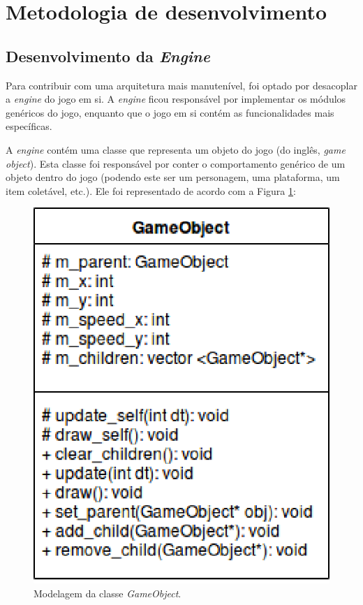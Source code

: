 \section{Metodologia de desenvolvimento} \label{devmet}

  \subsection{Desenvolvimento da \textit{Engine}}

    Para contribuir com uma arquitetura mais manutenível, foi optado por desacoplar a \textit{engine} do jogo em si. A \textit{engine} ficou responsável por implementar os módulos genéricos do jogo, enquanto que o jogo em si contém as funcionalidades mais específicas.

    A \textit{engine} contém uma classe que representa um objeto do jogo (do inglês, \textit{game object}). Esta classe foi responsável por conter o comportamento genérico de um objeto dentro do jogo (podendo este ser um personagem, uma plataforma, um item coletável, etc.). Ele foi representado de acordo com a Figura \ref{game-object}:

    \vspace{\onelineskip}

    \begin{figure}[H]
      \centering \includegraphics[keepaspectratio=true,scale=0.6]{figuras/game-object.eps}
      \caption[Modelagem da classe \textit{GameObject}]
        {Modelagem da classe \textit{GameObject}.}
      \label{game-object}
    \end{figure}

